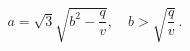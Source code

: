 \begin{equation}
 a = \sqrt{3} \sqrt{b^2-\frac{q}{v}}, \quad b>\sqrt{\frac{q}{v}}
 \,.
\end{equation}

